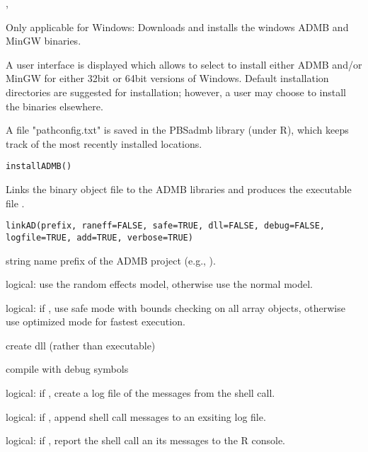 \documentclass[letterpaper]{book}
\begin{document}
%
\begin{SeeAlso}\relax
{}, 
\end{SeeAlso}
%
\begin{Description}\relax
Only applicable for Windows: Downloads and installs the windows ADMB and MinGW binaries.

A user interface is displayed which allows to select to install either ADMB and/or MinGW
for either 32bit or 64bit versions of Windows. Default installation directories are suggested
for installation; however, a user may choose to install the binaries elsewhere.

A file "pathconfig.txt" is saved in the PBSadmb library (under R), which keeps track of the
most recently installed locations.
\end{Description}
%
\begin{Usage}
\begin{verbatim}
installADMB()
\end{verbatim}
\end{Usage}
%
\begin{Description}\relax
Links the binary object file  to the ADMB libraries and 
produces the executable file .
\end{Description}
%
\begin{Usage}
\begin{verbatim}
linkAD(prefix, raneff=FALSE, safe=TRUE, dll=FALSE, debug=FALSE, logfile=TRUE, add=TRUE, verbose=TRUE)
\end{verbatim}
\end{Usage}
%
\begin{Arguments}
\begin{ldescription}
\item[\code{prefix}] string name prefix of the ADMB project (e.g., ).
\item[\code{raneff}] logical: use the random effects model, otherwise use the normal model.
\item[\code{safe}] logical: if , use safe mode with bounds checking on all
array objects, otherwise use optimized mode for fastest execution.
\item[\code{dll}] create dll (rather than executable)
\item[\code{debug}] compile with debug symbols
\item[\code{logfile}] logical: if , create a log file of the messages from the shell call.
\item[\code{add}] logical: if , append shell call messages to an exsiting log file.
\item[\code{verbose}] logical: if , report the shell call an its messages to the R console.
\end{ldescription}
\end{Arguments}
\end{document}
